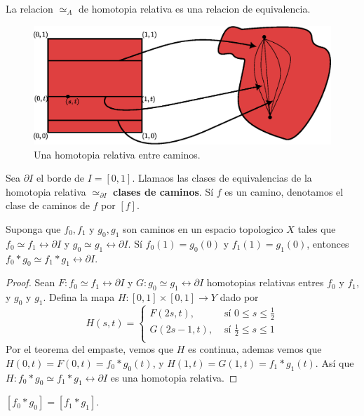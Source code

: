 \begin{lemma}\label{11.32}
    La relacion $\simeq_A$ de homotopia relativa es una relacion de
    equivalencia.
\end{lemma}

\begin{figure}[h]
    \centering
    \includegraphics[scale=0.5]{Figures/path_prod.eps}
    \caption{Una homotopia relativa entre caminos.}
    \label{fig_21}
\end{figure}

\begin{definition}
    Sea $\partial{I}$ el borde de $I=[0,1]$. Llamaos las clases de equivalencias
    de la homotopia relativa $\simeq_{\partial{I}}$ \textbf{clases de caminos}.
    S\'i $f$ es un camino, denotamos el clase de caminos de  $f$ por  $[f]$.
\end{definition}

\begin{theorem}\label{11.32}
    Suponga que $f_0,f_1$ y $g_0,g_1$ son caminos en un espacio topologico $X$
    tales que  $f_0 \simeq f_1 \rel{\partial{I}}$ y $g_0 \simeq g_1
    \rel{\partial{I}}$. S\'i $f_0(1)=g_0(0)$ y $f_1(1)=g_1(0)$, entonces
    $f_0 \ast g_0 \simeq f_1 \ast g_1 \rel{\partial{I}}$.
\end{theorem}
\begin{proof}
    Sean $F:f_0 \simeq f_1 \rel{\partial{I}}$ y $G:g_0 \simeq g_1
    \rel{\partial{I}}$ homotopias relativas entres  $f_0$ y $f_1$, y $g_0$ y
    $g_1$. Defina la mapa $H:[0,1] \times [0,1] \xrightarrow{} Y$ dado por
    \begin{equation*}
     H(s,t)=\begin{cases}
                 F(2s,t), & \text{ s\'i } 0 \leq s \leq \frac{1}{2} \\
                 G(2s-1,t), & \text{ s\'i } \frac{1}{2} \leq s \leq 1   \\
            \end{cases}
    \end{equation*}
    Por el teorema del empaste, vemos que $H$ es continua, ademas vemos que
    $H(0,t)=F(0,t)=f_0 \ast g_0(t)$, y $H(1,t)=G(1,t)=f_1 \ast g_1(t)$. As\'i
    que $H:f_0 \ast g_0 \simeq f_1 \ast g_1 \rel{\partial{I}}$ es una homotopia
    relativa.
\end{proof}
\begin{corollary}
    $[f_0 \ast g_0]=[f_1 \ast g_1]$.
\end{corollary}

